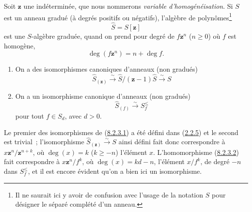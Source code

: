 \begin{env}[8.2.2]
\label{II.8.2.2-fr}
Soit $\mathbf{z}$ une indéterminée, que nous nommerons \emph{variable
d'homogénéisation}. Si $S$ est un anneau gradué (à degrés positifs ou
négatifs), l'algèbre de polynômes\footnote{Il ne saurait ici y avoir de
confusion avec l'usage de la notation $\widehat{S}$ pour désigner le séparé
complété d'un anneau.}
\begin{equation}
\label{II.8.2.2.1-fr}
  \widehat{S}=S[\mathbf{z}]
\tag{8.2.2.1}
\end{equation}
est une $S$-algèbre graduée, quand on prend pour degré de $f\mathbf{z}^n$ ($n\geq0$) où
$f$ est homogène,
\begin{equation}
\label{II.8.2.2.2-fr}
  \deg(f\mathbf{z}^n)=n+\deg f.
\tag{8.2.2.2}
\end{equation}
\end{env}

\begin{lemma}[8.2.3]
\label{II.8.2.3-fr}
\begin{enumerate}
\item[\rm(i)] On a des isomorphismes canoniques d'anneaux (non gradués)
\begin{equation}
\label{II.8.2.3.1-fr}
  \widehat{S}_{(\mathbf{z})}\xrightarrow{\sim}
  \widehat{S}/(\mathbf{z}-1)\widehat{S}\xrightarrow{\sim}S
\tag{8.2.3.1}
\end{equation}
\item[\rm(ii)] On a un isomorphisme canonique d'anneaux (non gradués)
\begin{equation}
\label{II.8.2.3.2-fr}
  \widehat{S}_{(f)}\xrightarrow{\sim}S_f^{\leq}
\tag{8.2.3.2}
\end{equation}
pour tout $f\in S_d$, avec $d>0$.
\end{enumerate}
\end{lemma}

Le premier des isomorphismes de (\hyperref[II.8.2.3.1-fr]{8.2.3.1}) a été
défini dans (\hyperref[II.2.2.5-fr]{2.2.5}) et le second est trivial~;
l'isomorphisme $\widehat{S}_{(\mathbf{z})}\xrightarrow{\sim}S$ ainsi défini fait donc
correspondre à $x\mathbf{z}^n/\mathbf{z}^{n+k}$, où $\deg(x)=k$ ($k\geq-n$) l'élément $x$.
L'homomorphisme (\hyperref[II.8.2.3.2-fr]{8.2.3.2}) fait correspondre à
$x\mathbf{z}^n/f^k$, où $\deg(x)=kd-n$, l'élément $x/f^k$, de degré $-n$ dans
$S_f^{\leq}$, et il est encore évident qu'on a bien ici un isomorphisme.

